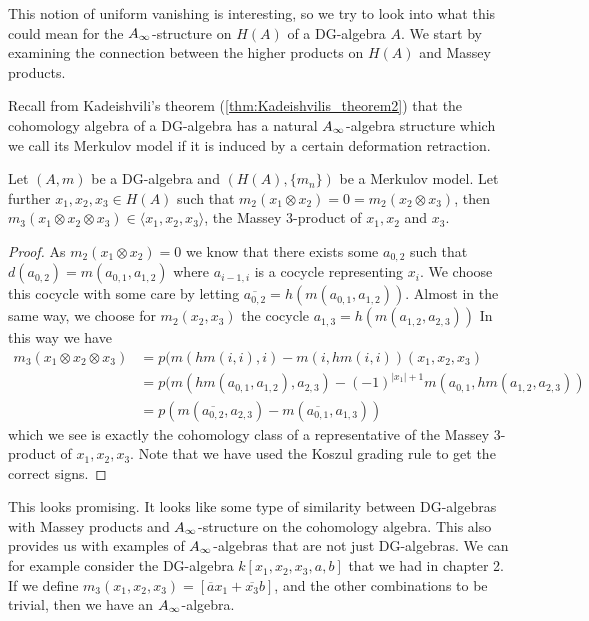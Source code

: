 
This notion of uniform vanishing is interesting, so we try to look into what this could mean for the $A_{\infty}$-structure on $H(A)$ of a DG-algebra $A$. We start by examining the connection between the higher products on $H(A)$ and Massey products. 

Recall from Kadeishvili's theorem (\cref{thm:Kadeishvilis_theorem2}) that the cohomology algebra of a DG-algebra has a natural $A_{\infty}$-algebra structure which we call its Merkulov model if it is induced by a certain deformation retraction.

\begin{lemma}
\label{lem:representing_3_massey}
Let $(A, m)$ be a DG-algebra and $(H(A), \{m_n\})$ be a Merkulov model. Let further $x_1, x_2, x_3 \in H(A)$ such that $m_2(x_1\otimes x_2) = 0 = m_2(x_2\otimes x_3)$, then $m_3(x_1 \otimes x_2 \otimes x_3) \in \langle x_1, x_2, x_3 \rangle$, the Massey 3-product of $x_1, x_2$ and $x_3$. 
\end{lemma}
\begin{proof}
As $m_2(x_1 \otimes x_2) = 0$ we know that there exists some $a_{0,2}$ such that $d(a_{0,2}) = m(a_{0,1}, a_{1,2})$ where $a_{i-1, i}$ is a cocycle representing $x_i$. We choose this cocycle with some care by letting $\overline{a_{0,2}} = h(m(a_{0,1}, a_{1,2}))$. Almost in the same way, we choose for $m_2(x_2, x_3)$ the cocycle $a_{1,3} = h(m(a_{1,2}, a_{2,3}))$ In this way we have
\begin{align*}
    m_3(x_1\otimes x_2\otimes x_3) 
    &= p(m(hm(i, i), i)-m(i, hm(i,i))(x_1, x_2, x_3) \\
    &= p(m(hm(a_{0,1}, a_{1,2}), a_{2,3}) - (-1)^{|x_1|+1} m(a_{0,1}, hm(a_{1,2}, a_{2,3})) \\
    &= p(m(\overline{a_{0,2}}, a_{2,3})-m(\overline{a_{0,1}}, a_{1,3}))
\end{align*}
which we see is exactly the cohomology class of a representative of the Massey 3-product of $x_1, x_2, x_3$. Note that we have used the Koszul grading rule to get the correct signs. 
\end{proof}

This looks promising. It looks like some type of similarity between DG-algebras with Massey products and $A_{\infty}$-structure on the cohomology algebra. This also provides us with examples of $A_{\infty}$-algebras that are not just DG-algebras. We can for example consider the DG-algebra $k[x_1, x_2, x_3, a, b]$ that we had in chapter 2. If we define $m_3(x_1, x_2, x_3)=[\overline{a}x_1 + \overline{x_3}b]$, and the other combinations to be trivial, then we have an $A_{\infty}$-algebra.

